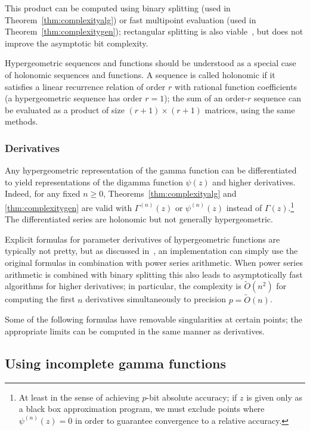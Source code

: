 \documentclass[reqno]{amsart}
\newcommand{\bigOtilde}{\widetilde O}
\theoremstyle{definition}
\begin{document}
This product can be computed using binary splitting (used in Theorem~\ref{thm:complexityalg})
or fast multipoint evaluation (used in Theorem~\ref{thm:complexitygen});
rectangular splitting is also viable~\cite{Johansson2014rectangular}, but does not
improve the asymptotic bit complexity.

Hypergeometric sequences and functions should
be understood as a special case of holonomic sequences and functions.
A sequence is called holonomic if it
satisfies a linear recurrence relation of order $r$ with rational
function coefficients (a hypergeometric sequence has order $r = 1$);
the sum of an order-$r$ sequence can be evaluated
as a product of size $(r+1) \times (r+1)$ matrices,
using the same methods.

\subsubsection{Derivatives}

Any hypergeometric representation of the gamma function
can be differentiated to yield representations of the digamma function $\psi(z)$
and higher derivatives.
Indeed, for any fixed $n \ge 0$, Theorems~\ref{thm:complexityalg} and \ref{thm:complexitygen}
are valid with $\Gamma^{(n)}(z)$ or 
$\psi^{(n)}(z)$ instead of $\Gamma(z)$.\footnote{At least in the sense of achieving $p$-bit absolute accuracy;
if $z$ is given only as a black box approximation program, we must exclude points where $\psi^{(n)}(z) = 0$
in order to guarantee convergence to a relative accuracy.}
The differentiated series are holonomic but not generally hypergeometric.

Explicit formulas for parameter derivatives of hypergeometric
functions are typically not pretty,
but as discussed in~\cite{Johansson2019hypergeometric},
an implementation can simply use the original formulas
in combination with
power series arithmetic.
When power series arithmetic is combined with binary splitting
this also leads to asymptotically fast algorithms
for higher derivatives;
in particular, the complexity is
$\bigOtilde(n^2)$ for computing the first $n$ derivatives
simultaneously to precision $p = \bigOtilde(n)$.

Some of the following formulas have removable singularities at
certain points; the appropriate limits can be computed
in the same manner as derivatives.

\subsection{Using incomplete gamma functions}
\end{document}
